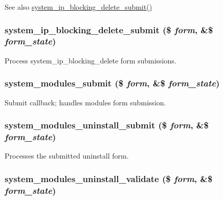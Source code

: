 \begin{DoxySeeAlso}{See also}
\hyperlink{system_8admin_8inc_af7847cfa490010815a7f39b139aececc}{system\_\-ip\_\-blocking\_\-delete\_\-submit()} 
\end{DoxySeeAlso}
\hypertarget{system_8admin_8inc_af7847cfa490010815a7f39b139aececc}{
\subsubsection[{system\_\-ip\_\-blocking\_\-delete\_\-submit}]{\setlength{\rightskip}{0pt plus 5cm}system\_\-ip\_\-blocking\_\-delete\_\-submit (\$ {\em form}, \/  \&\$ {\em form\_\-state})}}
\label{system_8admin_8inc_af7847cfa490010815a7f39b139aececc}
Process system\_\-ip\_\-blocking\_\-delete form submissions. \hypertarget{system_8admin_8inc_ab5e3e0148d76ec1bfe7e441d4ff56146}{
\subsubsection[{system\_\-modules\_\-submit}]{\setlength{\rightskip}{0pt plus 5cm}system\_\-modules\_\-submit (\$ {\em form}, \/  \&\$ {\em form\_\-state})}}
\label{system_8admin_8inc_ab5e3e0148d76ec1bfe7e441d4ff56146}
Submit callback; handles modules form submission. \hypertarget{system_8admin_8inc_aa4fa94b5401ff21e77b711edf0e196c4}{
\subsubsection[{system\_\-modules\_\-uninstall\_\-submit}]{\setlength{\rightskip}{0pt plus 5cm}system\_\-modules\_\-uninstall\_\-submit (\$ {\em form}, \/  \&\$ {\em form\_\-state})}}
\label{system_8admin_8inc_aa4fa94b5401ff21e77b711edf0e196c4}
Processes the submitted uninstall form. \hypertarget{system_8admin_8inc_a043bb0ba8fa3b299202ffee8d63e9fca}{
\subsubsection[{system\_\-modules\_\-uninstall\_\-validate}]{\setlength{\rightskip}{0pt plus 5cm}system\_\-modules\_\-uninstall\_\-validate (\$ {\em form}, \/  \&\$ {\em form\_\-state})}}
